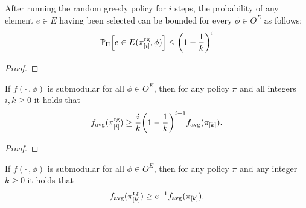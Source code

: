 \begin{lemma}
  After running the random greedy policy for $i$ steps, the probability of any element $e \in E$ having been selected can be bounded for every $\phi \in O^E$ as follows:
\begin{align*}
  \P[\Pi]{e \in E(\pigi, \phi)} \leq \left(1 - \frac{1}{k}\right)^i
\end{align*}
\end{lemma}
\begin{proof}
\end{proof}

\begin{theorem}
  If $f(\cdot\,, \phi)$ is submodular for all $\phi \in O^E$, then for any policy $\pi$ and all integers $i, k \geq 0$ it holds that
  \begin{align*}
    \favg(\pigi) \geq \frac{i}{k}\left(1 - \frac{1}{k}\right)^{i-1}\favg(\pik).
  \end{align*}
\end{theorem}
\begin{proof}
\end{proof}

\begin{cor}
  If $f(\cdot\,, \phi)$ is submodular for all $\phi \in O^E$, then for any policy $\pi$ and any integer $k \geq 0$ it holds that
  \begin{align*}
    f_{\mathrm{avg}}(\pi^{\textrm{rg}}_{[k]}) \geq e^{-1}f_{\mathrm{avg}}(\pi_{[k]}).
  \end{align*}
\end{cor}
